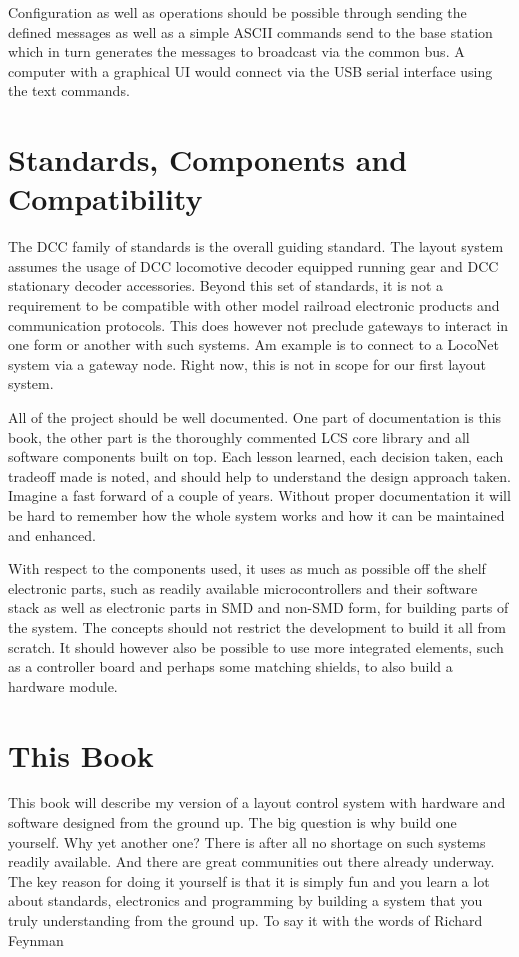 Configuration as well as operations should be possible through sending the defined messages as well as a simple ASCII commands send to the base station which in turn generates the messages to broadcast via the common bus. A computer with a graphical UI would connect via the USB serial interface using the text commands.

\section{Standards, Components and Compatibility}

The DCC family of standards is the overall guiding standard. The layout system assumes the usage of DCC locomotive decoder equipped running gear and DCC stationary decoder accessories. Beyond this set of standards, it is not a requirement to be compatible with other model railroad electronic products and communication protocols. This does however not preclude gateways to interact in one form or another with such systems. Am example is to connect to a LocoNet system via a gateway node. Right now, this is not in scope for our first layout system.

All of the project should be well documented. One part of documentation is this book, the other part is the thoroughly commented LCS core library and all software components built on top. Each lesson learned, each decision taken, each tradeoff made is noted, and should help to understand the design approach taken. Imagine a fast forward of a couple of years. Without proper documentation it will be hard to remember how the whole system works and how it can be maintained and enhanced.

With respect to the components used, it uses as much as possible off the shelf electronic parts, such as readily available microcontrollers and their software stack as well as electronic parts in SMD and non-SMD form, for building parts of the system. The concepts should not restrict the development to build it all from scratch. It should however also be possible to use more integrated elements, such as a controller board and perhaps some matching shields, to also build a hardware module.

\section{This Book}

This book will describe my version of a layout control system with hardware and software designed from the ground up. The big question is why build one yourself. Why yet another one? There is after all no shortage on such systems readily available. And there are great communities out there already underway. The key reason for doing it yourself is that it is simply fun and you learn a lot about standards, electronics and programming by building a system that you truly understanding from the ground up. To say it with the words of Richard Feynman

